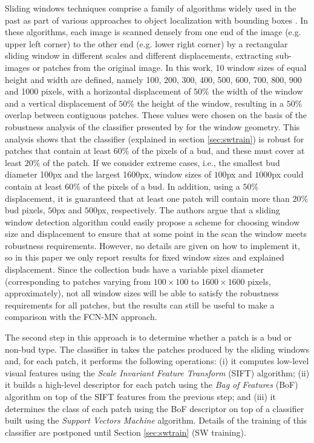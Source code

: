 \documentclass[a4paper,authoryear,review]{elsarticle}
\begin{document}
	Sliding windows techniques comprise a family of algorithms widely used in the past as part of various approaches to object localization with bounding boxes \citep{divvala2009empirical, wang2009hog, chum2007exemplar, ferrari2007groups, dalal2005histograms, rowley1996human}. In these algorithms, each image is scanned densely from one end of the image (e.g. upper left corner) to the other end (e.g. lower right corner) by a rectangular sliding window in different scales and different displacements, extracting sub-images or patches from the original image. In this work, 10 window sizes of equal height and width are defined, namely 100, 200, 300, 400, 500, 600, 700, 800, 900 and 1000 pixels, with a horizontal displacement of $50\%$ the width of the window and a vertical displacement of $50\%$ the height of the window, resulting in a $50\%$ overlap between contiguous patches. These values were chosen on the basis of the robustness analysis of the classifier presented by \citet{perez2017image} for the window geometry. This analysis shows that the classifier (explained in section \ref{sec:swtrain}) is robust for patches that contain at least $60\%$ of the pixels of a bud, and these must cover at least $20\%$ of the patch. If we consider extreme cases, i.e., the smallest bud diameter 100px and the largest 1600px, window sizes of $100$px and $1000$px could contain at least $60\%$ of the pixels of a bud. In addition, using a $50\%$ displacement, it is guaranteed that at least one patch will contain more than $20\%$ bud pixels, $50$px and $500$px, respectively. The authors argue that a sliding window detection algorithm could easily propose a scheme for choosing window size and displacement to ensure that at some point in the scan the window meets robustness requirements. However, no details are given on how to implement it, so in this paper we only report results for fixed window sizes and explained displacement. Since the collection buds have a variable pixel diameter (corresponding to patches varying from $100 \times100$ to $1600 \times 1600$ pixels, approximately), not all window sizes will be able to satisfy the robustness requirements for all patches, but the results can still be useful to make a comparison with the FCN-MN approach.  
	
	The second step in this approach is to determine whether a patch is a bud or non-bud type. The classifier in  \citet{perez2017image} takes the patches produced by the sliding windows and, for each patch, it performs the following operations: (i) it computes low-level visual features using the \emph{Scale Invariant Feature Transform} (SIFT) \citet{lowe2004distinctive} algorithm; (ii) it builds a high-level descriptor for each patch using the \emph{Bag of Features} (BoF) \citet{csurka2004visual} algorithm on top of the SIFT features from the previous step; and (iii) it determines the class of each patch using the BoF descriptor on top of a classifier built using the \emph{Support Vectors Machine} \citet{vapnik2013nature} algorithm. Details of the training of this classifier are postponed until Section \ref{sec:swtrain} (SW training).
	
\end{document}
